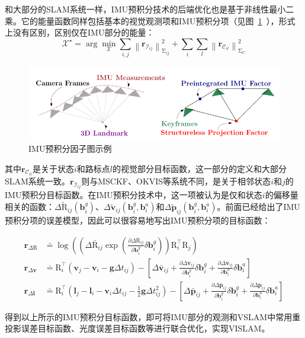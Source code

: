 和大部分的SLAM系统一样，IMU预积分技术的后端优化也是基于非线性最小二乘。它的能量函数同样包括基本的视觉观测项和IMU预积分项（见图~\ref{fig:preint}~），形式上没有区别，区别仅在IMU部分的能量：
\begin{equation}\label{eq:gtsam_res}
    \bm{\mathcal X}^\star =
        \arg\mathop{\min}_{\bm{\mathcal X}}
        \sum_{i,j}\left\| \bm{r}_{\mathcal{I}_{ij}} \right\|^2_{\mathrm\Sigma_{ij}} +
        \sum_{i} \sum_{l} \left\| \bm{r}_{\mathcal{C}_{il}} \right\|^2_{\mathrm\Sigma_{C}}
\end{equation}

\begin{figure}[htb!]
    \centering
    \includegraphics[width=.6\textwidth]{Pictures/preint.png}
    \caption{IMU预积分因子图示例\citep{forster2017manifold}}
    \label{fig:preint}
\end{figure}

其中$\bm{r}_{\mathcal{C}_{il}}$是关于状态$i$和路标点$l$的视觉部分目标函数，这一部分的定义和大部分SLAM系统一致。$\bm{r}_{\mathcal{I}_{ij}}$则与MSCKF、OKVIS等系统不同，是关于相邻状态$i$和$j$的IMU预积分目标函数。在IMU预积分技术中，这一项被认为是仅和状态$i$的偏移量相关的函数：$\Delta\tilde{\mathrm R}_{ij}(\bm{b}^g_i)$、$\Delta\tilde{\bm v}_{ij}(\bm{b}^g_i, \bm{b}^a_i)$和$\Delta\tilde{\bm p}_{ij}(\bm{b}^g_i, \bm{b}^a_i)$。前面已经给出了IMU预积分项的误差模型，因此可以很容易地写出IMU预积分项的目标函数：

\begin{equation}
\begin{aligned}
  \bm{r}_{\Delta\mathrm{R}}
    &\doteq
      \log\left(
        \left(
          \Delta\bar{\mathrm R}_{ij}
          \exp\left(
            \tfrac{\partial\Delta\bar{\mathrm R}_{ij}}{\partial\bm{b}^g_i}
            \delta\bm{b}^g_i\right)
        \right) \mathrm{R}^\top_i \mathrm{R}_j
      \right) \\
  \bm{r}_{\Delta\bm{v}}
    &\doteq
      \mathrm{R}^\top_i(\bm{v}_j - \bm{v}_i - \bm{g}\Delta t_{ij}) -
      \left[
        \Delta\bar{\bm v}_{ij} +
        \tfrac{\partial\Delta\bar{\bm v}_{ij}}{\partial\bm{b}^g_i}
        \delta\bm{b}^g_i +
        \tfrac{\partial\Delta\bar{\bm v}_{ij}}{\partial\bm{b}^a_i}
        \delta\bm{b}^a_i
      \right] \\
  \bm{r}_{\Delta\bm{l}}
    &\doteq
      \mathrm{R}^\top_i(
        \bm{l}_j - \bm{l}_i -
        \bm{v}_i \Delta t_{ij} -
        \tfrac{1}{2}\bm{g}\Delta t^2_{ij}) -
      \left[
        \Delta\bar{\bm p}_{ij} +
        \tfrac{\partial\Delta\bar{\bm p}_{ij}}{\partial\bm{b}^g_i}
        \delta\bm{b}^g_i +
        \tfrac{\partial\Delta\bar{\bm p}_{ij}}{\partial\bm{b}^a_i}
        \delta\bm{b}^a_i \right]
\end{aligned}
\end{equation}

得到以上所示的IMU预积分目标函数，即可将IMU部分的观测和VSLAM中常用重投影误差目标函数、光度误差目标函数等进行联合优化，实现VISLAM。

